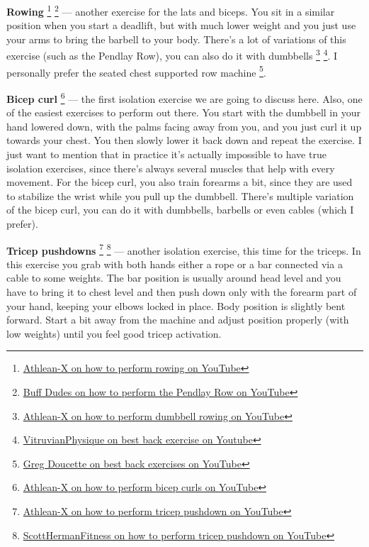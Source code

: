 \documentclass[openany, 12pt]{book}
\begin{document}
        \textbf{Rowing}
        \footnote{\href{https://www.youtube.com/watch?v=T3N-TO4reLQ}{Athlean-X on how to perform rowing on YouTube}}
        \footnote{\href{https://www.youtube.com/watch?v=h4nkoayPFWw}{Buff Dudes on how to perform the Pendlay Row on YouTube}}
        --- another exercise for the lats and biceps. You sit in a similar position when you start a deadlift, but with much lower weight and you just use your arms to bring the barbell to your body.
        There's a lot of variations of this exercise (such as the Pendlay Row), you can also do it with dumbbells
        \footnote{\href{https://www.youtube.com/watch?v=EEFHHOCfHgw}{Athlean-X on how to perform dumbbell rowing on YouTube}}
        \footnote{\href{https://www.youtube.com/watch?v=1G8czSqCqEA}{VitruvianPhysique on best back exercise on Youtube}}. I personally prefer the seated chest supported row machine
        \footnote{\href{https://www.youtube.com/watch?v=6_xDB8oMkKE}{Greg Doucette on best back exercises on YouTube}}.

        \textbf{Bicep curl}
        \footnote{\href{https://www.youtube.com/watch?v=yTWO2th-RIY}{Athlean-X on how to perform bicep curls on YouTube}}
        --- the first isolation exercise we are going to discuss here. Also, one of the easiest exercises to perform out there. You start with the dumbbell in your hand lowered down, with the palms
        facing away from you, and you just curl it up towards your chest. You then slowly lower it back down and repeat the exercise.
        I just want to mention that in practice it's actually impossible to have true isolation exercises, since there's always several muscles that help
        with every movement. For the bicep curl, you also train forearms a bit, since they are used to stabilize the wrist while you pull up the dumbbell.
        There's multiple variation of the bicep curl, you can do it with dumbbells, barbells or even cables (which I prefer).

        \textbf{Tricep pushdowns}
        \footnote{\href{https://www.youtube.com/watch?v=REWv05om0ho}{Athlean-X on how to perform tricep pushdown on YouTube}}
        \footnote{\href{https://www.youtube.com/watch?v=2-LAMcpzODU}{ScottHermanFitness on how to perform tricep pushdown on YouTube}}
        --- another isolation exercise, this time for the triceps. In this exercise you grab with both hands either a rope or a bar connected via a cable to some weights.
        The bar position is usually around head level and you have to bring it to chest level and then push down only with the
        forearm part of your hand, keeping your elbows locked in place. Body position is slightly bent forward. Start a bit away from the machine and adjust position properly (with low weights)
        until you feel good tricep activation.
\end{document}
